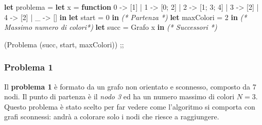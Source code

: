 \documentclass[11pt]{article}
\newenvironment{Shaded}{}{}
\newcommand{\KeywordTok}[1]{\textcolor[rgb]{0.00,0.44,0.13}{\textbf{{#1}}}}
\newcommand{\DataTypeTok}[1]{\textcolor[rgb]{0.56,0.13,0.00}{{#1}}}
\newcommand{\DecValTok}[1]{\textcolor[rgb]{0.25,0.63,0.44}{{#1}}}
\newcommand{\CommentTok}[1]{\textcolor[rgb]{0.38,0.63,0.69}{\textit{{#1}}}}
\newcommand{\NormalTok}[1]{{#1}}
\begin{document}
\begin{Shaded}
\begin{Highlighting}[]
\KeywordTok{let}\NormalTok{ problema =}
  \KeywordTok{let}\NormalTok{ x = }\KeywordTok{function}        
        \DecValTok{0}\NormalTok{ {-}\textgreater{} [}\DecValTok{1}\NormalTok{]}
\NormalTok{      | }\DecValTok{1}\NormalTok{ {-}\textgreater{} [}\DecValTok{0}\NormalTok{; }\DecValTok{2}\NormalTok{]}
\NormalTok{      | }\DecValTok{2}\NormalTok{ {-}\textgreater{} [}\DecValTok{1}\NormalTok{; }\DecValTok{3}\NormalTok{; }\DecValTok{4}\NormalTok{]}
\NormalTok{      | }\DecValTok{3}\NormalTok{ {-}\textgreater{} [}\DecValTok{2}\NormalTok{]}
\NormalTok{      | }\DecValTok{4}\NormalTok{ {-}\textgreater{} [}\DecValTok{2}\NormalTok{]}
\NormalTok{      | \_ {-}\textgreater{} [] }\KeywordTok{in}
  \KeywordTok{let}\NormalTok{ start = }\DecValTok{0} \KeywordTok{in}       \CommentTok{(* Partenza *)}
  \KeywordTok{let}\NormalTok{ maxColori = }\DecValTok{2} \KeywordTok{in}   \CommentTok{(* Massimo numero di colori*)}
  \KeywordTok{let} \DataTypeTok{succ}\NormalTok{ = Grafo x }\KeywordTok{in}  \CommentTok{(* Successori *)}

\NormalTok{  (Problema (}\DataTypeTok{succ}\NormalTok{, start, maxColori))}
\NormalTok{;;}
\end{Highlighting}
\end{Shaded}

    \hypertarget{problema-1}{%
\subsubsection{\texorpdfstring{Problema 1
}{Problema 1 }}\label{problema-1}}

    Il \textbf{problema 1} è formato da un grafo non orientato e sconnesso,
composto da 7 nodi. Il punto di partenza è il \emph{nodo 3} ed ha un
numero massimo di colori \(N = 3\). Questo problema è stato scelto per
far vedere come l'algoritmo si comporta con grafi sconnessi: andrà a
colorare solo i nodi che riesce a raggiungere.
\end{document}
